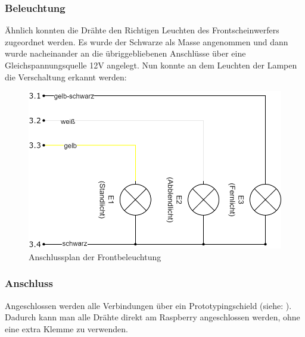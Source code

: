 \newpage

\subsubsection{Beleuchtung}

Ähnlich konnten die Drähte den Richtigen Leuchten des Frontscheinwerfers zugeordnet werden. Es wurde der Schwarze als Masse angenommen und dann wurde nacheinander an die übriggebliebenen Anschlüsse über eine Gleichspannungsquelle 12V angelegt. Nun konnte an dem Leuchten der Lampen die Verschaltung erkannt werden:

\begin{figure}[H]
	\begin{center}
		\includegraphics[scale=0.35]{figures/hcis/Motorrad_light.png}
		\caption{Anschlussplan der Frontbeleuchtung}
		\label{fig:light}
	\end{center}
\end{figure}

\subsubsection{Anschluss}

Angeschlossen werden alle Verbindungen über ein Prototypingschield (siehe: ). Dadurch kann man alle Drähte direkt am Raspberry angeschlossen werden, ohne eine extra Klemme zu verwenden.

